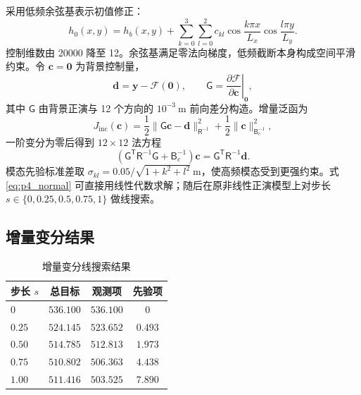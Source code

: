 \documentclass[UTF8,fontset=none]{ctexart}
\newcommand{\vect}[1]{\boldsymbol{#1}}
\begin{document}
采用低频余弦基表示初值修正：
\begin{equation}
h_0(x,y)
=h_b(x,y)+
\sum_{k=0}^{3}\sum_{l=0}^{2}
c_{kl}\cos\frac{k\pi x}{L_x}\cos\frac{l\pi y}{L_y}.
\end{equation}
控制维数由 20000 降至 12。余弦基满足零法向梯度，低频截断本身构成空间平滑约束。令 $\vect c=\vect0$ 为背景控制量，
\begin{equation}
\vect d=\vect y-\mathcal F(\vect0),
\qquad
\mathsf G=\left.\frac{\partial\mathcal F}{\partial\vect c}\right|_{\vect0},
\end{equation}
其中 $\mathsf G$ 由背景正演与 12 个方向的 $10^{-3}\ \mathrm m$ 前向差分构造。增量泛函为
\begin{equation}
J_{\mathrm{inc}}(\vect c)
=\frac12\|\mathsf G\vect c-\vect d\|_{\mathsf R^{-1}}^2
+\frac12\|\vect c\|_{\mathsf B_c^{-1}}^2,
\end{equation}
一阶变分为零后得到 $12\times12$ 法方程
\begin{equation}
\boxed{
(\mathsf G^\mathsf T\mathsf R^{-1}\mathsf G+\mathsf B_c^{-1})\vect c
=\mathsf G^\mathsf T\mathsf R^{-1}\vect d
}.
\label{eq:p4_normal}
\end{equation}
模态先验标准差取 $\sigma_{kl}=0.05/\sqrt{1+k^2+l^2}\ \mathrm m$，使高频模态受到更强约束。式 \eqref{eq:p4_normal} 可直接用线性代数求解；随后在原非线性正演模型上对步长 $s\in\{0,0.25,0.5,0.75,1\}$ 做线搜索。

\subsection{增量变分结果}

\begin{table}[H]
\centering
\caption{增量变分线搜索结果}
\renewcommand{\arraystretch}{1.35}
\begin{tabular*}{\textwidth}{@{\extracolsep{\fill}}lccc@{}}
\toprule[1pt]
步长 $s$ & 总目标 & 观测项 & 先验项\\
\midrule
$0$ & $536.100$ & $536.100$ & $0$\\
$0.25$ & $524.145$ & $523.652$ & $0.493$\\
$0.50$ & $514.785$ & $512.813$ & $1.973$\\
$0.75$ & $\mathbf{510.802}$ & $506.363$ & $4.438$\\
$1.00$ & $511.416$ & $503.525$ & $7.890$\\
\bottomrule[1pt]
\end{tabular*}
\label{tab:p4_linesearch}
\end{table}
\end{document}
